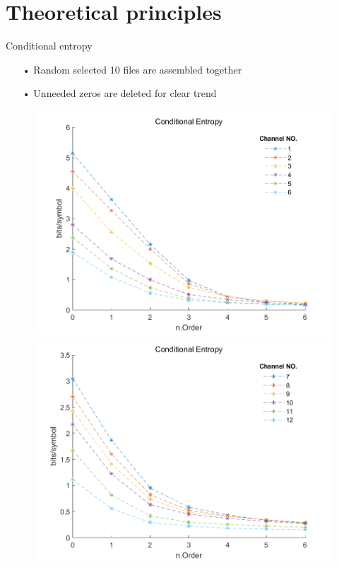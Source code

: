 \documentclass[notes=hide]{beamer}
\begin{document}
\section{Theoretical principles}
\begin{frame}


   \begin{block}{Conditional entropy}
   	\begin{itemize}
   		\item [•] Random selected 10 files are assembled together
   		\item [•] Unneeded zeros are deleted for clear trend
   	\end{itemize}
   \end{block}
   \begin{figure}
   	\includegraphics[scale=0.26]{Vortrag/10f6oc1to6.png}
   	\includegraphics[scale=0.26]{Vortrag/10f6oc7to12.png}

\end{figure}
\end{frame}
\end{document}
